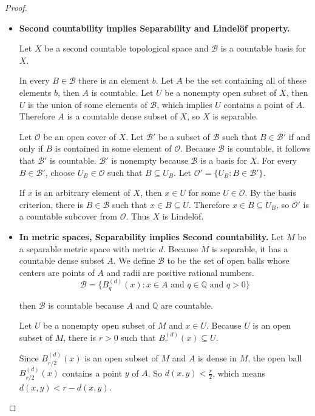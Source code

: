 \begin{proof}
	\begin{itemize}
		\item \textbf{Second countability implies Separability and Lindelöf property.}

		      Let $X$ be a second countable topological space and $\mathscr{B}$ is a countable basis for $X$.

		      In every $B\in\mathscr{B}$ there is an element $b$. Let $A$ be the set containing all of these elements $b$, then $A$ is countable. Let $U$ be a nonempty open subset of $X$, then $U$ is the union of some elements of $\mathscr{B}$, which implies $U$ contains a point of $A$. Therefore $A$ is a countable dense subset of $X$, so $X$ is separable.

		      Let $\mathcal{O}$ be an open cover of $X$. Let $\mathscr{B}'$ be a subset of $\mathscr{B}$ such that $B\in\mathscr{B}'$ if and only if $B$ is contained in some element of $\mathcal{O}$. Because $\mathscr{B}$ is countable, it follows that $\mathscr{B}'$ is countable. $\mathscr{B}'$ is nonempty because $\mathscr{B}$ is a basis for $X$. For every $B\in\mathscr{B}'$, choose $U_{B}\in\mathcal{O}$ such that $B\subseteq U_{B}$. Let $\mathcal{O}' = \{ U_{B} : B\in\mathscr{B}' \}$.

		      If $x$ is an arbitrary element of $X$, then $x\in U$ for some $U\in\mathcal{O}$. By the basis criterion, there is $B\in\mathscr{B}$ such that $x\in B\subseteq U$. Therefore $x\in B\subseteq U_{B}$, so $\mathcal{O}'$ is a countable subcover from $\mathcal{O}$. Thus $X$ is Lindelöf.
		\item \textbf{In metric spaces, Separability implies Second countability.}
		      Let $M$ be a separable metric space with metric $d$. Because $M$ is separable, it has a countable dense subset $A$. We define $\mathscr{B}$ to be the set of open balls whose centers are points of $A$ and radii are positive rational numbers.
		      \[
			      \mathscr{B} = \{ B^{(d)}_{q}(x) : x\in A \text{ and } q\in \mathbb{Q} \text{ and } q > 0 \}
		      \]

		      then $\mathscr{B}$ is countable because $A$ and $\mathbb{Q}$ are countable.

		      Let $U$ be a nonempty open subset of $M$ and $x\in U$. Because $U$ is an open subset of $M$, there is $r > 0$ such that $B^{(d)}_{r}(x)\subseteq U$.

		      Since $B^{(d)}_{r/2}(x)$ is an open subset of $M$ and $A$ is dense in $M$, the open ball $B^{(d)}_{r/2}(x)$ contains a point $y$ of $A$. So $d(x, y) < \frac{r}{2}$, which means $d(x, y) < r - d(x, y)$.


\end{itemize}
\end{proof}
